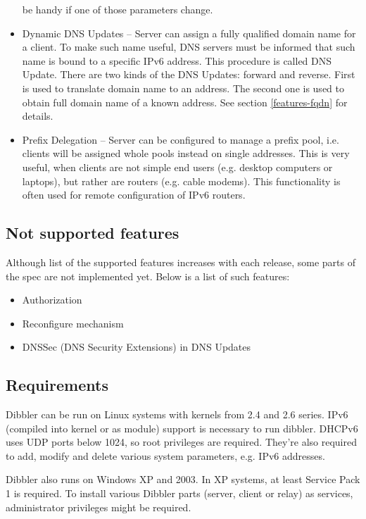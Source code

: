 \begin{itemize}
      be handy if one of those parameters change. \cite{draft-lifetime}
\item Dynamic DNS Updates -- Server can assign a fully qualified
      domain name for a client. To make such name useful, DNS servers
      must be informed that such name is bound to a specific IPv6
      address. This procedure is called DNS Update. There are two kinds
      of the DNS Updates: forward and reverse. First is used to
      translate domain name to an address. The second one is used to
      obtain full domain name of a known address. See section
      \ref{features-fqdn} for details. \cite{rfc4704}
\item Prefix Delegation -- Server can be configured to manage a prefix
      pool, i.e. clients will be assigned whole pools instead on
      single addresses. This is very useful, when clients are not
      simple end users (e.g. desktop computers or laptops), but rather
      are routers (e.g. cable modems). This functionality is often
      used for remote configuration of IPv6 routers. \cite{rfc3633}
\end{itemize}

\subsection{Not supported features}
Although list of the supported features increases with each release,
some parts of the spec are not implemented yet. Below is a list of such
features:

\begin{itemize}
 \item Authorization \cite{rfc3315}
 \item Reconfigure mechanism \cite{rfc3315}
 \item DNSSec (DNS Security Extensions) \cite{rfc4033} in DNS Updates \cite{rfc4704}
\end{itemize}

\subsection{Requirements}
Dibbler can be run on Linux systems with kernels from 2.4 and 2.6
series. IPv6 (compiled into kernel or as module) support is necessary
to run dibbler. DHCPv6 uses UDP ports below 1024, so root privileges
are required. They're also required to add, modify and delete various
system parameters, e.g. IPv6 addresses.

Dibbler also runs on Windows XP and 2003. In XP systems, at least
Service Pack 1 is required. To install various Dibbler parts (server,
client or relay) as services, administrator privileges might be
required. 

